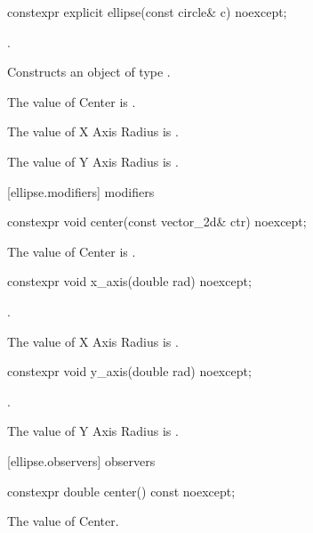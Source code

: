 \begin{itemdecl}
constexpr explicit ellipse(const circle& c) noexcept;
\end{itemdecl}
\begin{itemdescr}
\pnum
\preconditions
{}.

\pnum
\effects
Constructs an object of type .

\pnum
The value of Center is .

\pnum
The value of X Axis Radius is .

\pnum
The value of Y Axis Radius is .
\end{itemdescr}

 [ellipse.modifiers]{ modifiers}

\begin{itemdecl}
constexpr void center(const vector_2d& ctr) noexcept;
\end{itemdecl}

\begin{itemdescr}
\pnum
\effects
The value of Center is .
\end{itemdescr}

\begin{itemdecl}
constexpr void x_axis(double rad) noexcept;
\end{itemdecl}
\begin{itemdescr}
\preconditions
{}.

\pnum
\effects
The value of X Axis Radius is .
\end{itemdescr}

\begin{itemdecl}
constexpr void y_axis(double rad) noexcept;
\end{itemdecl}
\begin{itemdescr}
\preconditions
{}.

\pnum
\effects
The value of Y Axis Radius is .
\end{itemdescr}

 [ellipse.observers]{ observers}

\begin{itemdecl}
constexpr double center() const noexcept;
\end{itemdecl}
\begin{itemdescr}
\pnum
\returns
The value of Center.
\end{itemdescr}

